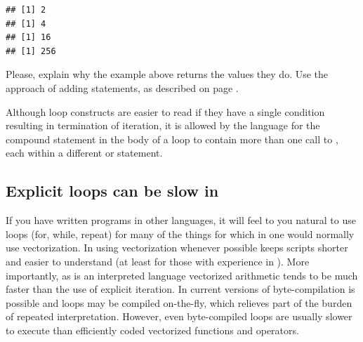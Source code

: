 \documentclass[krantz2]{krantz}\usepackage{knitr}%
\begin{document}
\begin{knitrout}\footnotesize
{}\color{fgcolor}\begin{kframe}
\begin{alltt}
 \hlkwb{<-} 
\hlstd{\{}
    \hlopt{>} \hlstd{)} \hlstd{()}
   \hlkwb{<-} \hlopt{^}
\hlstd{\}}
\end{alltt}
\begin{verbatim}
## [1] 2
## [1] 4
## [1] 16
## [1] 256
\end{verbatim}
\end{kframe}
\end{knitrout}

\begin{playground}
Please, explain why the example above returns the values they do. Use the approach of adding  statements, as described on page \pageref{box:play:forloop}.
\end{playground}

\begin{explainbox}
Although  loop constructs are easier to read if they have a single condition resulting in termination of iteration, it is allowed by the \Rlang language for the compound statement in the body of a loop to contain more than one call to , each within a different  or  statement.
\end{explainbox}

\subsection{Explicit loops can be slow in \Rlang}\label{sec:loops:slow}
If you have written programs in other languages, it will feel to you natural to use loops (for, while, repeat) for many of the things for which in \Rlang one would normally use vectorization. In \Rlang using vectorization whenever possible keeps scripts shorter and easier to understand (at least for those with experience in \Rlang). More importantly, as \Rlang is an interpreted language vectorized arithmetic tends to be much faster than the use of explicit iteration. In current versions of \Rpgrm byte-compilation is possible and loops may be compiled on-the-fly, which relieves part of the burden of repeated interpretation. However, even byte-compiled loops are usually slower to execute than efficiently coded vectorized functions and operators.
\end{document}
